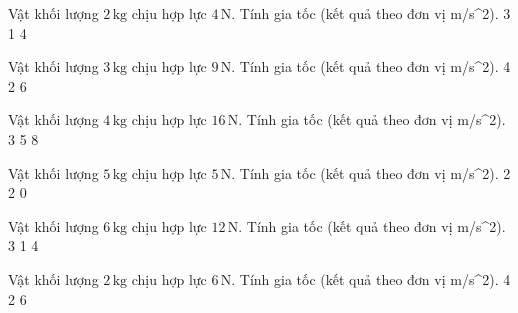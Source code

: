 \begin{ex}
Vật khối lượng $2\,\text{kg}$ chịu hợp lực $4\,\text{N}$. Tính gia tốc (kết quả theo đơn vị m/s^2).
\choice
{}
{3}
{1}
{4}
\end{ex}

\begin{ex}
Vật khối lượng $3\,\text{kg}$ chịu hợp lực $9\,\text{N}$. Tính gia tốc (kết quả theo đơn vị m/s^2).
\choice
{4}
{}
{2}
{6}
\end{ex}

\begin{ex}
Vật khối lượng $4\,\text{kg}$ chịu hợp lực $16\,\text{N}$. Tính gia tốc (kết quả theo đơn vị m/s^2).
\choice
{3}
{5}
{}
{8}
\end{ex}

\begin{ex}
Vật khối lượng $5\,\text{kg}$ chịu hợp lực $5\,\text{N}$. Tính gia tốc (kết quả theo đơn vị m/s^2).
\choice
{2}
{2}
{0}
{}
\end{ex}

\begin{ex}
Vật khối lượng $6\,\text{kg}$ chịu hợp lực $12\,\text{N}$. Tính gia tốc (kết quả theo đơn vị m/s^2).
\choice
{}
{3}
{1}
{4}
\end{ex}

\begin{ex}
Vật khối lượng $2\,\text{kg}$ chịu hợp lực $6\,\text{N}$. Tính gia tốc (kết quả theo đơn vị m/s^2).
\choice
{4}
{}
{2}
{6}
\end{ex}

